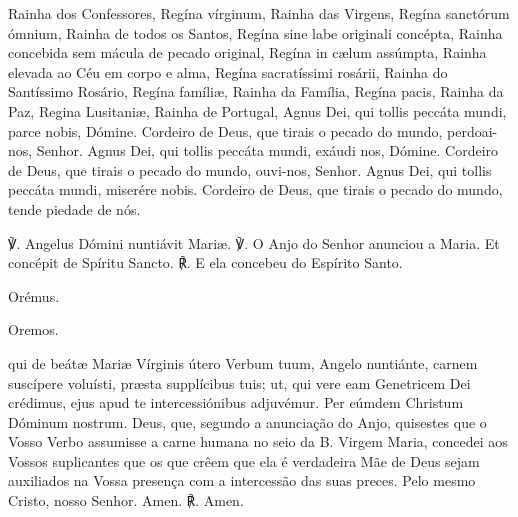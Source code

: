 \begin{paracol}{2}
\switchcolumn
Rainha dos Confessores,
\switchcolumn*
Regína vírginum,
\switchcolumn
Rainha das Virgens,
\switchcolumn*
Regína sanctórum ómnium,
\switchcolumn
Rainha de todos os Santos,
\switchcolumn*
Regína sine labe originali concépta,
\switchcolumn
Rainha concebida sem mácula de pecado original,
\switchcolumn*
Regína in cælum assúmpta,
\switchcolumn
Rainha elevada ao Céu em corpo e alma,
\switchcolumn*
Regína sacratíssimi rosárii,
\switchcolumn
Rainha do Santíssimo Rosário,
\switchcolumn*
Regína famíliæ,
\switchcolumn
Rainha da Família,
\switchcolumn*
Regína pacis,
\switchcolumn
Rainha da Paz,
\switchcolumn*
Regina Lusitaniæ,
\switchcolumn
Rainha de Portugal,
\switchcolumn*
Agnus Dei, qui tollis peccáta mundi, parce nobis, Dómine.
\switchcolumn
Cordeiro de Deus, que tirais o pecado do mundo, perdoai-nos, Senhor.
\switchcolumn*
Agnus Dei, qui tollis peccáta mundi, exáudi nos, Dómine.
\switchcolumn
Cordeiro de Deus, que tirais o pecado do mundo, ouvi-nos, Senhor.
\switchcolumn*
Agnus Dei, qui tollis peccáta mundi, miserére nobis.
\switchcolumn
Cordeiro de Deus, que tirais o pecado do mundo, tende piedade de nós.
\end{paracol}

\begin{nscenter}\emph{}\end{nscenter}

\begin{paracol}{2}
{\redx ℣.} Angelus Dómini nuntiávit Mariæ.
\switchcolumn
{\redx ℣.} O Anjo do Senhor anunciou a Maria.
 Et concépit de Spíritu Sancto.
\switchcolumn
{\redx ℟.} E ela concebeu do Espírito Santo.
\switchcolumn*
\begin{nscenter} {\redx Orémus.} \end{nscenter}
\switchcolumn
\begin{nscenter} {\redx Oremos.} \end{nscenter}
\switchcolumn*
{} qui de beátæ Mariæ Vírginis útero Verbum tuum, Angelo nuntiánte, carnem suscípere voluísti, præsta supplícibus tuis; ut, qui vere eam Genetricem Dei crédimus, ejus apud te intercessiónibus adjuvémur. Per eúmdem Christum Dóminum nostrum.
\switchcolumn
{} Deus, que, segundo a anunciação do Anjo, quisestes que o Vosso Verbo assumisse a carne humana no seio da B. Virgem Maria, concedei aos Vossos suplicantes que os que crêem que ela é verdadeira Mãe de Deus sejam auxiliados na Vossa presença com a intercessão das suas preces. Pelo mesmo Cristo, nosso Senhor.
 Amen.
\switchcolumn
{\redx ℟.} Amen.
\end{paracol}

